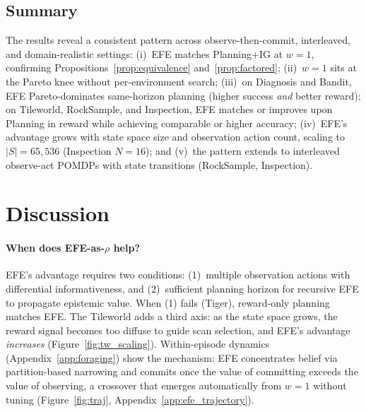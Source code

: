 \documentclass[runningheads]{llncs}
\begin{document}
\subsection{Summary}

The results reveal a consistent pattern across observe-then-commit, interleaved, and domain-realistic settings: (i)~EFE matches Planning+IG at $w{=}1$, confirming Propositions~\ref{prop:equivalence} and~\ref{prop:factored}; (ii)~$w{=}1$ sits at the Pareto knee without per-environment search; (iii)~on Diagnosis and Bandit, EFE Pareto-dominates same-horizon planning (higher success \emph{and} better reward); on Tileworld, RockSample, and Inspection, EFE matches or improves upon Planning in reward while achieving comparable or higher accuracy; (iv)~EFE's advantage grows with state space size and observation action count, scaling to $|S|{=}65{,}536$ (Inspection $N{=}16$); and (v)~the pattern extends to interleaved observe-act POMDPs with state transitions (RockSample, Inspection).

\section{Discussion}
\label{sec:discussion}

\paragraph{When does EFE-as-$\rho$ help?}
EFE's advantage requires two conditions: (1)~multiple observation actions with differential informativeness, and (2)~sufficient planning horizon for recursive EFE to propagate epistemic value. When (1) fails (Tiger), reward-only planning matches EFE. The Tileworld adds a third axis: as the state space grows, the reward signal becomes too diffuse to guide scan selection, and EFE's advantage \emph{increases} (Figure~\ref{fig:tw_scaling}). Within-episode dynamics (Appendix~\ref{app:foraging}) show the mechanism: EFE concentrates belief via partition-based narrowing and commits once the value of committing exceeds the value of observing, a crossover that emerges automatically from $w{=}1$ without tuning (Figure~\ref{fig:traj}, Appendix~\ref{app:efe_trajectory}).
\end{document}
